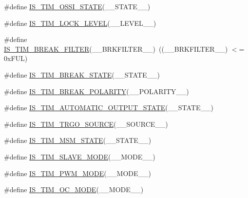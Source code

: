 \begin{DoxyCompactItemize}
\item 
\#define \hyperlink{group___t_i_m___private___macros_gaf5097557634d53d3f9438cf222e2192b}{I\+S\+\_\+\+T\+I\+M\+\_\+\+O\+S\+S\+I\+\_\+\+S\+T\+A\+TE}(\+\_\+\+\_\+\+S\+T\+A\+T\+E\+\_\+\+\_\+)
\item 
\#define \hyperlink{group___t_i_m___private___macros_gad53d9e9b4fa060db29f3900b3dfcb3ed}{I\+S\+\_\+\+T\+I\+M\+\_\+\+L\+O\+C\+K\+\_\+\+L\+E\+V\+EL}(\+\_\+\+\_\+\+L\+E\+V\+E\+L\+\_\+\+\_\+)
\item 
\#define \hyperlink{group___t_i_m___private___macros_ga6eb4b934436eb7afd965214963abfb62}{I\+S\+\_\+\+T\+I\+M\+\_\+\+B\+R\+E\+A\+K\+\_\+\+F\+I\+L\+T\+ER}(\+\_\+\+\_\+\+B\+R\+K\+F\+I\+L\+T\+E\+R\+\_\+\+\_\+)~((\+\_\+\+\_\+\+B\+R\+K\+F\+I\+L\+T\+E\+R\+\_\+\+\_\+) $<$= 0x\+F\+U\+L)
\item 
\#define \hyperlink{group___t_i_m___private___macros_ga74dc07721b4a34a59194df534fb5fdd8}{I\+S\+\_\+\+T\+I\+M\+\_\+\+B\+R\+E\+A\+K\+\_\+\+S\+T\+A\+TE}(\+\_\+\+\_\+\+S\+T\+A\+T\+E\+\_\+\+\_\+)
\item 
\#define \hyperlink{group___t_i_m___private___macros_ga42d1d6f041253c2a07ddee8d4411e2db}{I\+S\+\_\+\+T\+I\+M\+\_\+\+B\+R\+E\+A\+K\+\_\+\+P\+O\+L\+A\+R\+I\+TY}(\+\_\+\+\_\+\+P\+O\+L\+A\+R\+I\+T\+Y\+\_\+\+\_\+)
\item 
\#define \hyperlink{group___t_i_m___private___macros_gab060abc03ca5cd3421a9279a5403cea3}{I\+S\+\_\+\+T\+I\+M\+\_\+\+A\+U\+T\+O\+M\+A\+T\+I\+C\+\_\+\+O\+U\+T\+P\+U\+T\+\_\+\+S\+T\+A\+TE}(\+\_\+\+\_\+\+S\+T\+A\+T\+E\+\_\+\+\_\+)
\item 
\#define \hyperlink{group___t_i_m___private___macros_ga9c59624b1c4a60f39385da551ab31e53}{I\+S\+\_\+\+T\+I\+M\+\_\+\+T\+R\+G\+O\+\_\+\+S\+O\+U\+R\+CE}(\+\_\+\+\_\+\+S\+O\+U\+R\+C\+E\+\_\+\+\_\+)
\item 
\#define \hyperlink{group___t_i_m___private___macros_gafac5c2fba615264d7a1de6f85cfccc9a}{I\+S\+\_\+\+T\+I\+M\+\_\+\+M\+S\+M\+\_\+\+S\+T\+A\+TE}(\+\_\+\+\_\+\+S\+T\+A\+T\+E\+\_\+\+\_\+)
\item 
\#define \hyperlink{group___t_i_m___private___macros_gafce89506518ce113eb70e424f4dc1c5b}{I\+S\+\_\+\+T\+I\+M\+\_\+\+S\+L\+A\+V\+E\+\_\+\+M\+O\+DE}(\+\_\+\+\_\+\+M\+O\+D\+E\+\_\+\+\_\+)
\item 
\#define \hyperlink{group___t_i_m___private___macros_ga7274d2a669edfcb25bcf610ec85a528b}{I\+S\+\_\+\+T\+I\+M\+\_\+\+P\+W\+M\+\_\+\+M\+O\+DE}(\+\_\+\+\_\+\+M\+O\+D\+E\+\_\+\+\_\+)
\item 
\#define \hyperlink{group___t_i_m___private___macros_gac6968ae64781c2bda9f8714fe45917d0}{I\+S\+\_\+\+T\+I\+M\+\_\+\+O\+C\+\_\+\+M\+O\+DE}(\+\_\+\+\_\+\+M\+O\+D\+E\+\_\+\+\_\+)

\end{DoxyCompactItemize}
